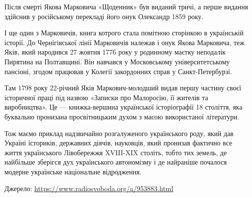Після смерті Якова Марковича «Щоденник» був виданий тричі, а перше видання
здійснив у російському перекладі його онук Олександр 1859 року.

І ще один з Марковичів, книга котрого стала помітною сторінкою в українській
історії. До Чернігівської лінії Марковичів належав і онук Якова Марковича, теж
Яків, який народився 27 жовтня 1776 року у родинному маєтку неподалік Пирятина
на Полтавщині. Він навчався у Московському університетському пансіоні, згодом
працював у Колегії закордонних справ у Санкт-Петербурзі.

Там 1798 року 22-річний Яків Маркович-молодший видав першу частину своєї
історичної праці під назвою «Записки про Малоросію, її жителів та виробництва».
Це --- книжка-вершина української історіографії 18 століття, яка буквально
пронизана просвітницьким духом з масою використаної літератури.

Тож маємо приклад надзвичайно розгалуженого українського роду, який дав Україні
істориків, державних діячів, науковців, який пронизав фактично все життя
українського Лівобережжя XVIII-XIX століть, тобто тих земель, де найбільше
зберігся дух українського автономізму і де найраніше почалося модерне
українське національне відродження.

Джерело:
\url{https://www.radiosvoboda.org/a/953883.html}

